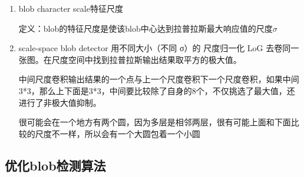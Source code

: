 \documentclass[UTF8]{ctexart}
\begin{document}
\begin{itemize}
\begin{enumerate}
        \item blob character scale特征尺度
        
        定义：blob的特征尺度是使该blob中心达到拉普拉斯最大响应值的尺度$\sigma$
        

        \item scale-space blob detector
        用不同大小（不同 σ）的 尺度归一化 LoG 去卷同一张图。在尺度空间中找到拉普拉斯输出结果取平方的极大值。

        中间尺度卷积输出结果的一个点与上一个尺度卷积下一个尺度卷积，如果中间3*3，那么上下面是3*3，中间要比较除了自身的8个，不仅挑选了最大值，还进行了非极大值抑制。

        很可能会在一个地方有两个圆，因为多层是相邻两层，很有可能上面和下面比较的尺度不一样，所以会有一个大圆包着一个小圆
    \end{enumerate}
\end{itemize}

\subsection{优化blob检测算法}
\end{document}
